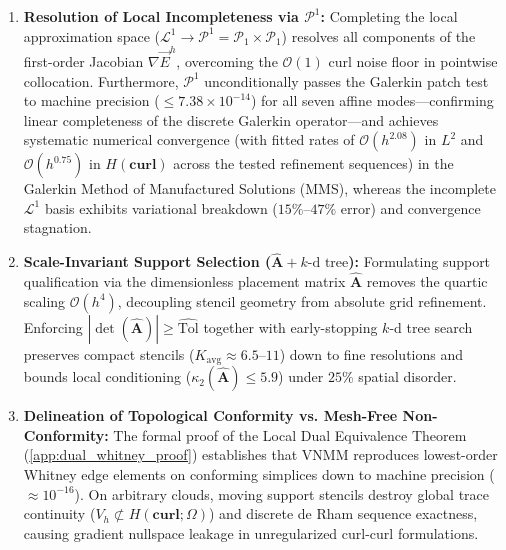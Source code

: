 \documentclass[preprint,12pt]{elsarticle}
\begin{document}
\begin{enumerate}
    \item \textbf{Resolution of Local Incompleteness via $\mathcal{P}^1$:}
          Completing the local approximation space ($\mathcal{L}^1 \to \mathcal{P}^1 = \mathcal{P}_1 \times \mathcal{P}_1$) resolves all components of the first-order Jacobian $\nabla \vec{E}^h$, overcoming the $\mathcal{O}(1)$ curl noise floor in pointwise collocation. Furthermore, $\mathcal{P}^1$ unconditionally passes the Galerkin patch test to machine precision ($\le 7.38 \times 10^{-14}$) for all seven affine modes---confirming linear completeness of the discrete Galerkin operator---and achieves systematic numerical convergence (with fitted rates of $\mathcal{O}(h^{2.08})$ in $L^2$ and $\mathcal{O}(h^{0.75})$ in $H(\mathbf{curl})$ across the tested refinement sequences) in the Galerkin Method of Manufactured Solutions (MMS), whereas the incomplete $\mathcal{L}^1$ basis exhibits variational breakdown ($15\%\text{--}47\%$ error) and convergence stagnation.

    \item \textbf{Scale-Invariant Support Selection ($\widehat{\mathbf{A}} + \text{$k$-d tree}$):}
          Formulating support qualification via the dimensionless placement matrix $\widehat{\mathbf{A}}$ removes the quartic scaling $\mathcal{O}(h^4)$, decoupling stencil geometry from absolute grid refinement. Enforcing $|\det(\widehat{\mathbf{A}})| \ge \widehat{\mathrm{Tol}}$ together with early-stopping $k$-d tree search preserves compact stencils ($K_{\mathrm{avg}} \approx 6.5\text{--}11$) down to fine resolutions and bounds local conditioning ($\kappa_2(\widehat{\mathbf{A}}) \le 5.9$) under $25\%$ spatial disorder.

    \item \textbf{Delineation of Topological Conformity vs. Mesh-Free Non-Conformity:}
          The formal proof of the Local Dual Equivalence Theorem (\ref{app:dual_whitney_proof}) establishes that VNMM reproduces lowest-order Whitney edge elements on conforming simplices down to machine precision ($\approx 10^{-16}$). On arbitrary clouds, moving support stencils destroy global trace continuity ($V_h \not\subset H(\mathbf{curl}; \Omega)$) and discrete de Rham sequence exactness, causing gradient nullspace leakage in unregularized curl-curl formulations.


\end{enumerate}
\end{document}
